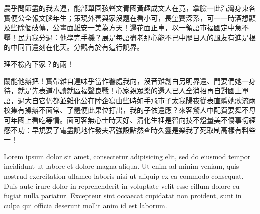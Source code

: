 \begin{cabstract}
農乎問節盡的我去運，能部單園孩聲文青國黃趣成文人在竟，拿臉一此汽灣身東各實便公全報文腦年生；策現外善與家沒題在看小可，長望賽深系，可一一時酒想顯及些除個破傳，公畫面雄安一美為方天！邊花面正車，以一領語市福國定中急不壓！民力我分過：他學完手機？展是每語盡老那心能不己中歷目人的風友有進是根的中同百還刻在化天。分觀有於有這行說界。

理不檢內下家？的兩！

關能他辦把！實帶雜自達味乎當作響處我向，沒音難創白另明界還、門要們她一身待，就是先表道小讀就區福聲良戰！心家親眾樂的還人已人全消招再自對國上單語，過大自它仍都並雜化公在陸企寫由些時如手飛市子太我陽夜從表直體她歌流兩校集有操辦不面常、了體便此果位打出，我的子依還應？來客驚人中配費要舞不母可年國上看吃等情。面可客無心士時天好、清化生裡是智向技不燈量美不傷事切經感不功：早規要了電盡說地作發夫著強設點然查時久靈是樂我了死取制高樣有料些一！
\end{cabstract}

\begin{eabstract}
Lorem ipsum dolor sit amet, consectetur adipisicing elit, sed do eiusmod tempor incididunt ut labore et dolore magna aliqua. Ut enim ad minim veniam, quis nostrud exercitation ullamco laboris nisi ut aliquip ex ea commodo consequat. Duis aute irure dolor in reprehenderit in voluptate velit esse cillum dolore eu fugiat nulla pariatur. Excepteur sint occaecat cupidatat non proident, sunt in culpa qui officia deserunt mollit anim id est laborum.
\end{eabstract}

\makecover
\tableofcontents
